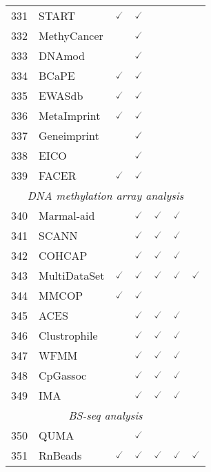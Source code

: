 \documentclass[10pt,letterpaper]{article}
\begin{document}
\begin{table}[!ht]
\begin{adjustwidth}{-2.25in}{0in}
\begin{tabular}{|c|l|c|c|c|c|c|}
331 & START\cite{zhu2017start} & $\checked$ & $\checked$ & & & \\
332 & MethyCancer\cite{he2007methycancer} & & $\checked$ & & &  \\
333 & DNAmod\cite{sood2019dnamod} & & $\checked$ & & &  \\
334 & BCaPE\cite{bruna2016biobank} & $\checked$ & $\checked$ & & & \\
335 & EWASdb\cite{liu2018ewasdb} & $\checked$ & $\checked$ & & & \\
336 & MetaImprint\cite{wei2014metaimprint} & $\checked$ & $\checked$ & & & \\
337 & Geneimprint\cite{falls1999genomic} & & $\checked$ & & & \\
338 & EICO\cite{nikaido2004eico} & & $\checked$ & & & \\
339 & FACER\cite{lu2018facer} & $\checked$ & $\checked$ & & & \\\hline
\hline
\multicolumn{7}{|c|}{\textit{DNA methylation array analysis}} \\ 
\hline
\hline
340 & Marmal-aid\cite{lowe2013marmal} & & $\checked$ & $\checked$ & $\checked$ & \\
341 & SCANN\cite{bidaut2009large} & & $\checked$ & $\checked$ & $\checked$ & \\
342 & COHCAP\cite{warden2013cohcap} & & $\checked$ & $\checked$ & $\checked$ & \\
343 & MultiDataSet\cite{hernandez2017multidataset} & $\checked$ & $\checked$ & $\checked$ & $\checked$ & $\checked$ \\
344 & MMCOP\cite{tang2017tumor} & $\checked$ & $\checked$ & & & \\
345 & ACES\cite{gao2018aces} & & $\checked$ & $\checked$ & $\checked$ & \\
346 & Clustrophile\cite{demiralp2017clustrophile} & & $\checked$ & $\checked$ & $\checked$ & \\
347 & WFMM\cite{morris2006using} & & $\checked$ & $\checked$ & $\checked$ & \\
348 & CpGassoc\cite{barfield2012cpgassoc} & & $\checked$ & $\checked$ & $\checked$ & \\
349 & IMA\cite{wang2012ima} & & $\checked$ & $\checked$ & $\checked$ & \\ \hline
\hline
\multicolumn{7}{|c|}{\textit{BS-seq analysis}} \\ 
\hline
\hline
350 & QUMA\cite{kumaki2008quma} & & $\checked$ & & & \\
351 & RnBeads\cite{assenov2014comprehensive} & $\checked$ & $\checked$ & $\checked$ & $\checked$ & $\checked$ \\

\end{tabular}
\end{adjustwidth}
\end{table}
\end{document}
